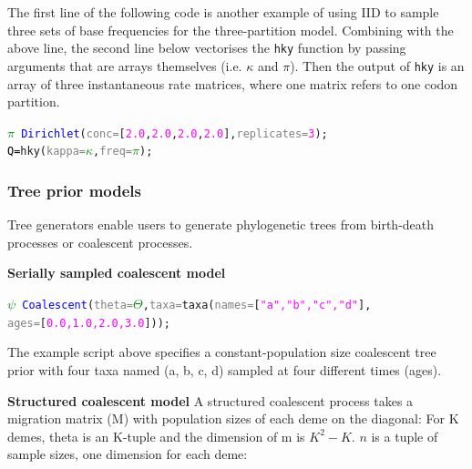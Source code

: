 \documentclass[10pt,letterpaper,table]{article}
\begin{document}
The first line of the following code is another example of using IID to sample three sets of base frequencies for the three-partition model. 
Combining with the above line, the second line below vectorises the \texttt{hky} function by passing arguments that are arrays themselves (i.e. \texttt{$\kappa$} and \texttt{$\pi$}).
Then the output of \texttt{hky} is an array of three instantaneous rate matrices, where one matrix refers to one codon partition.

{\small
\begin{alltt}
  \textcolor{green}{\(\pi\)} ~ \textcolor{blue}{Dirichlet}(\textcolor{gray}{conc=}[\textcolor{magenta}{2.0}, \textcolor{magenta}{2.0}, \textcolor{magenta}{2.0}, \textcolor{magenta}{2.0}], \textcolor{gray}{replicates=}\textcolor{magenta}{3});
  \textcolor{black}{Q = }\textcolor{magenta!80!black}{hky}(\textcolor{gray}{kappa=}\textcolor{green}{\(\kappa\)}, \textcolor{gray}{freq=}\textcolor{green}{\(\pi\)});
\end{alltt} 


\subsubsection{Tree prior models}
\label{sec:treeprior}
Tree generators enable users to generate phylogenetic trees from birth-death processes or coalescent processes. 
\newline

\noindent{} \textbf{Serially sampled coalescent model}
{\small
  \begin{alltt}
    \textcolor{green}{\(\psi\)} ~ \textcolor{blue}{Coalescent}(\textcolor{gray}{theta=}\textcolor{green}{\(\Theta\)}, \textcolor{gray}{taxa=}\textcolor{magenta!80!black}{taxa}(\textcolor{gray}{names=}[\textcolor{magenta}{"a", "b", "c", "d"}], \\  \textcolor{gray}{ages=}[\textcolor{magenta}{0.0, 1.0, 2.0, 3.0}]));
  \end{alltt}
}
\noindent{} The example script above specifies a
constant-population size coalescent tree prior \cite{kingman82} with four taxa named (a, b, c, d) 
sampled at four different times (ages).
\newline 

\noindent{} \textbf{Structured coalescent model}
\newline
A structured coalescent process takes a migration matrix (M) with
population sizes of each deme on the diagonal:
For K demes, theta is an K-tuple and the dimension of m is $K^2 -
K$. $n$ is a tuple of sample sizes, one dimension for each deme:

}
\end{document}

